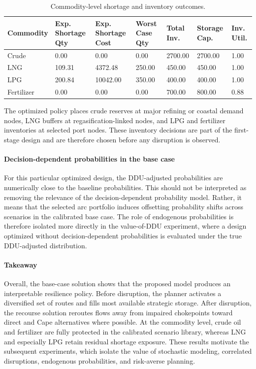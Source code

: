 \documentclass[final,3p,authoryear]{elsarticle}
\theoremstyle{definition}
\begin{document}
\begin{table}[ht]
\centering
\caption{Commodity-level shortage and inventory outcomes.}
\label{tab:tab01_commodity_outcomes}
\small %
\begin{tabularx}{\textwidth}{lXXXXXX}
\toprule
\textbf{Commodity} & \textbf{Exp. Shortage Qty} & \textbf{Exp. Shortage Cost} & \textbf{Worst Case Qty} & \textbf{Total Inv.} & \textbf{Storage Cap.} & \textbf{Inv. Util.} \\
\midrule
Crude      & 0.00   & 0.00     & 0.00   & 2700.00 & 2700.00 & 1.00 \\
LNG        & 109.31 & 4372.48  & 250.00 & 450.00  & 450.00  & 1.00 \\
LPG        & 200.84 & 10042.00 & 350.00 & 400.00  & 400.00  & 1.00 \\
Fertilizer & 0.00   & 0.00     & 0.00   & 700.00  & 800.00  & 0.88 \\
\bottomrule
\end{tabularx}
\end{table}

The optimized policy places crude reserves at major refining or coastal demand nodes, LNG buffers at regasification-linked nodes, and LPG and fertilizer inventories at selected port nodes. These inventory decisions are part of the first-stage design and are therefore chosen before any disruption is observed.

\paragraph{Decision-dependent probabilities in the base case}
For this particular optimized design, the DDU-adjusted probabilities
are numerically close to the baseline probabilities. This should not be
interpreted as removing the relevance of the decision-dependent
probability model. Rather, it means that the selected arc portfolio
induces offsetting probability shifts across scenarios in the calibrated
base case. The role of endogenous probabilities is therefore isolated
more directly in the value-of-DDU experiment, where a design optimized
without decision-dependent probabilities is evaluated under the true
DDU-adjusted distribution.

\paragraph{Takeaway}
Overall, the base-case solution shows that the proposed model produces
an interpretable resilience policy. Before disruption, the planner
activates a diversified set of routes and fills most available
strategic storage. After disruption, the recourse solution reroutes
flows away from impaired chokepoints toward direct and Cape alternatives
where possible. At the commodity level, crude oil and fertilizer are
fully protected in the calibrated scenario library, whereas LNG and
especially LPG retain residual shortage exposure. These results motivate
the subsequent experiments, which isolate the value of stochastic
modeling, correlated disruptions, endogenous probabilities, and
risk-averse planning.
\end{document}
